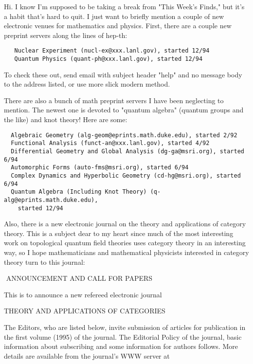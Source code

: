 

Hi.  I know I'm supposed to be taking a break from "This Week's Finds,"
but it's a habit that's hard to quit.  I just want to briefly mention a
couple of new electronic venues for mathematics and physics.  First,
there are a couple new preprint servers along the lines of hep-th:

\begin{verbatim}
   Nuclear Experiment (nucl-ex@xxx.lanl.gov), started 12/94 
   Quantum Physics (quant-ph@xxx.lanl.gov), started 12/94 
\end{verbatim}
    

To check these out, send email with subject header "help" and no message
body to the address listed, or use more slick modern method.

There are also a bunch of math preprint servers I have been neglecting
to mention.  The newest one is devoted to "quantum algebra" (quantum
groups and the like) and knot theory!  Here are some:

\begin{verbatim}
  Algebraic Geometry (alg-geom@eprints.math.duke.edu), started 2/92 
  Functional Analysis (funct-an@xxx.lanl.gov), started 4/92
  Differential Geometry and Global Analysis (dg-ga@msri.org), started 6/94 
  Automorphic Forms (auto-fms@msri.org), started 6/94 
  Complex Dynamics and Hyperbolic Geometry (cd-hg@msri.org), started 6/94 
  Quantum Algebra (Including Knot Theory) (q-alg@eprints.math.duke.edu),
    started 12/94 
\end{verbatim}
    

Also, there is a new electronic journal on the theory and applications
of category theory.  This is a subject dear to my heart since much of
the most interesting work on topological quantum field theories uses
category theory in an interesting way, so I hope mathematicians and
mathematical physicists interested in category theory turn to this
journal:


               
$$
               ANNOUNCEMENT AND CALL FOR PAPERS
 
       This is to announce a new refereed electronic journal
 
 
            THEORY AND APPLICATIONS OF CATEGORIES
 
 
The Editors, who are listed below, invite submission of articles 
for publication in the first volume (1995) of the journal.   
The Editorial Policy of the journal, basic information about 
subscribing and some information for authors follows. 
More details are available from the journal's WWW server at
 
